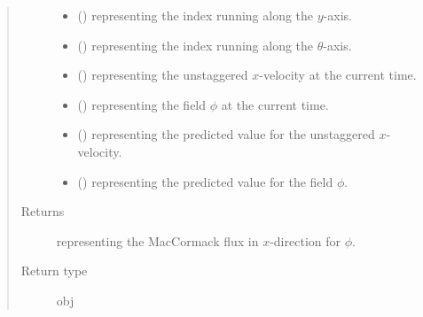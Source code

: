 \documentclass[letterpaper,10pt,english]{sphinxmanual}
\begin{document}
\begin{fulllineitems}
\begin{fulllineitems}
\begin{quote}
\begin{description}
\begin{itemize}
\item {} 
 () \textendash{}  representing the index running along the \(y\)-axis.

\item {} 
 () \textendash{}  representing the index running along the \(\theta\)-axis.

\item {} 
 () \textendash{}  representing the unstaggered \(x\)-velocity at the current time.

\item {} 
 () \textendash{}  representing the field \(\phi\) at the current time.

\item {} 
 () \textendash{}  representing the predicted value for the unstaggered \(x\)-velocity.

\item {} 
 () \textendash{}  representing the predicted value for the field \(\phi\).

\end{itemize}

\item[{Returns}] \leavevmode
{} representing the MacCormack flux in \(x\)-direction for \(\phi\).

\item[{Return type}] \leavevmode
obj

\end{description}\end{quote}

\end{fulllineitems}



\end{fulllineitems}
\end{document}
